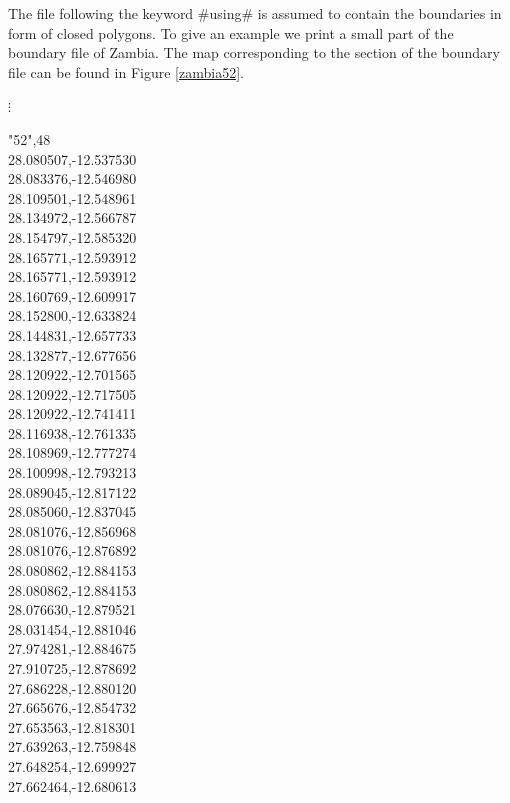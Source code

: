 \documentclass{article}
\begin{document}
The file following the keyword #using# is assumed to contain the
boundaries in form of closed polygons. To give an example we print
a small part of the boundary file of Zambia. The map corresponding
to the section of the boundary file can be found in Figure
\ref{zambia52}.

\footnotesize

\hspace{1cm}  $\vdots$

 "52",48\\
 28.080507,-12.537530\\
 28.083376,-12.546980\\
 28.109501,-12.548961\\
 28.134972,-12.566787\\
 28.154797,-12.585320\\
 28.165771,-12.593912\\
 28.165771,-12.593912\\
 28.160769,-12.609917\\
 28.152800,-12.633824\\
 28.144831,-12.657733\\
 28.132877,-12.677656\\
 28.120922,-12.701565\\
 28.120922,-12.717505\\
 28.120922,-12.741411\\
 28.116938,-12.761335\\
 28.108969,-12.777274\\
 28.100998,-12.793213\\
 28.089045,-12.817122\\
 28.085060,-12.837045\\
 28.081076,-12.856968\\
 28.081076,-12.876892\\
 28.080862,-12.884153\\
 28.080862,-12.884153\\
 28.076630,-12.879521\\
 28.031454,-12.881046\\
 27.974281,-12.884675\\
 27.910725,-12.878692\\
 27.686228,-12.880120\\
 27.665676,-12.854732\\
 27.653563,-12.818301\\
 27.639263,-12.759848\\
 27.648254,-12.699927\\
 27.662464,-12.680613\\
\end{document}
